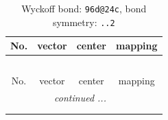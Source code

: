 \documentclass[fleqn,8pt]{jsarticle}
\begin{document}
\renewcommand{\arraystretch}{1.2}
\begin{longtable}{cccc}
\caption{Wyckoff bond: {\tt 96d@24c}, bond symmetry: {\tt ..2}}
 \\
 \hline \hline
No. & vector & center & mapping \\ \hline \endfirsthead

\multicolumn{3}{l}{\tablename\ \thetable{}} \\
 \hline \hline
No. & vector & center & mapping \\ \hline \endhead

 \hline \hline
\multicolumn{3}{r}{\footnotesize\it continued ...} \\ \endfoot

 \hline \hline
\multicolumn{3}{r}{} \\ \endlastfoot


\end{longtable}
\end{document}
